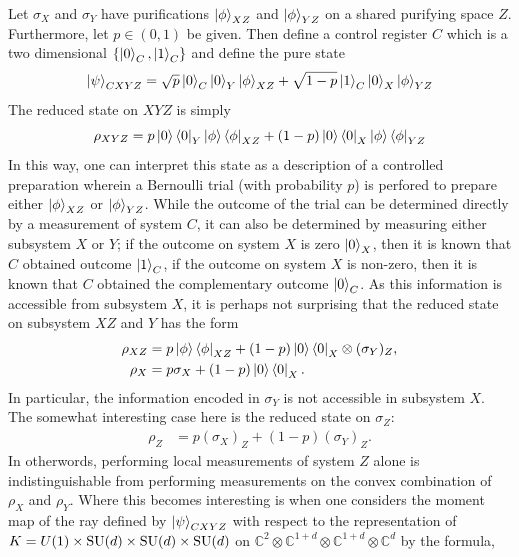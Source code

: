 \documentclass[notitlepage]{article}
\begin{document}
Let $\sigma_X$ and $\sigma_Y$ have purifications $\ket{\phi}_{XZ}$ and $\ket{\phi}_{YZ}$ on a shared purifying space $Z$.
Furthermore, let $p \in (0,1)$ be given.
Then define a control register $C$ which is a two dimensional $\{\ket 0_C, \ket 1_C\}$ and define the pure state
\begin{equation}
    \ket \psi_{CXYZ} 
    = \sqrt{p}\ket{0}_{C} \ket{0}_Y \ket{\phi}_{XZ} + \sqrt{1-p}\ket{1}_{C}\ket{0}_{X} \ket{\phi}_{YZ}
\end{equation}
The reduced state on $XYZ$ is simply
\begin{equation}
    \rho_{XYZ}
    = p \ket{0}\bra{0}_Y \ket{\phi}\bra{\phi}_{XZ} + (1-p)\ket{0}\bra{0}_{X} \ket{\phi}\bra{\phi}_{YZ}
\end{equation}
In this way, one can interpret this state as a description of a controlled preparation wherein a Bernoulli trial (with probability $p$) is perfored to prepare either $\ket{\phi}_{XZ}$ or $\ket{\phi}_{YZ}$.
While the outcome of the trial can be determined directly by a measurement of system $C$, it can also be determined by measuring either subsystem $X$ or $Y$; if the outcome on system $X$ is zero $\ket{0}_X$, then it is known that $C$ obtained outcome $\ket{1}_C$, if the outcome on system $X$ is non-zero, then it is known that $C$ obtained the complementary outcome $\ket{0}_{C}$.
As this information is accessible from subsystem $X$, it is perhaps not surprising that the reduced state on subsystem $XZ$ and $Y$ has the form
\begin{align}
    \rho_{XZ} &= p \ket{\phi}\bra{\phi}_{XZ} + (1-p)\ket{0}\bra{0}_{X} \otimes (\sigma_{Y})_Z, \\
    \rho_{X} &= p \sigma_X + (1-p)\ket{0}\bra{0}_{X}.
\end{align}
In particular, the information encoded in $\sigma_Y$ is not accessible in subsystem $X$.
The somewhat interesting case here is the reduced state on $\sigma_Z$:
\begin{align}
    \rho_{Z} &= p (\sigma_{X})_Z + (1-p)(\sigma_{Y})_Z.
\end{align}
In otherwords, performing local measurements of system $Z$ alone is indistinguishable from performing measurements on the convex combination of $\rho_{X}$ and $\rho_{Y}$.
Where this becomes interesting is when one considers the moment map of the ray defined by $\ket{\psi}_{CXYZ}$ with respect to the representation of $K = U(1) \times \operatorname{SU}(d) \times \operatorname{SU}(d) \times \operatorname{SU}(d)$ on $\mathbb C^{2} \otimes \mathbb C^{1+d} \otimes \mathbb C^{1+d} \otimes \mathbb C^{d}$ by the formula,
\end{document}
